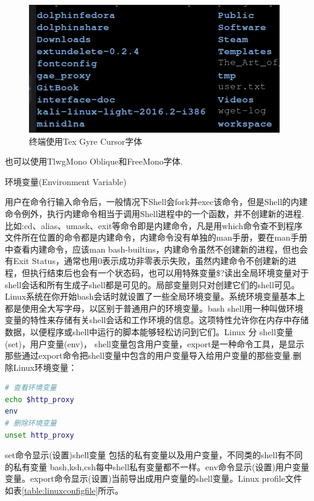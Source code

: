 \documentclass[12pt]{book}
\makeatletter
\numberwithin{dummy}{section}
\theoremstyle{ocrenumbox}
\theoremstyle{blacknumex}
\theoremstyle{blacknumbox}
\theoremstyle{ocrenum}
\renewcommand{\subsection}{\@startsection {subsection}{2}{\z@}
	{-3ex \@plus -0.1ex \@minus -.4ex}
	{0.5ex \@plus.2ex }
	{\normalfont\sffamily\bfseries}}
\makeatother
\begin{document}
\begin{figure}[htbp]
	\centering
	\includegraphics[scale=0.5]{fonttexgyrecursor.png}
	\caption{终端使用Tex Gyre Cursor字体}
	\label{fig:fonttexgyrecursor}
\end{figure}

也可以使用TlwgMono Oblique和FreeMono字体.

\subsection{环境变量(Environment Variable)}

用户在命令行输入命令后，一般情况下Shell会fork并exec该命令，但是Shell的内建命令例外，执行内建命令相当于调用Shell进程中的一个函数，并不创建新的进程.
比如:cd、alias、umask、exit等命令即是内建命令，凡是用which命令查不到程序文件所在位置的命令都是内建命令，内建命令没有单独的man手册，要在man手册中查看内建命令，应该man bash-builtins，内建命令虽然不创建新的进程，但也会有Exit Status，通常也用0表示成功非零表示失败，虽然内建命令不创建新的进程，但执行结束后也会有一个状态码，也可以用特殊变量\$?读出全局环境变量对于shell会话和所有生成子shell都是可见的。局部变量则只对创建它们的shell可见。Linux系统在你开始bash会话时就设置了一些全局环境变量。系统环境变量基本上都是使用全大写字母，以区别于普通用户的环境变量。bash shell用一种叫做环境变量的特性来存储有关shell会话和工作环境的信息。这项特性允许你在内存中存储数据，以便程序或shell中运行的脚本能够轻松访问到它们。Linux 分 shell变量(set)，用户变量(env)， shell变量包含用户变量，export是一种命令工具，是显示那些通过export命令把shell变量中包含的用户变量导入给用户变量的那些变量.删除Linux环境变量：

\begin{lstlisting}[language=Bash]
# 查看环境变量
echo $http_proxy
env
# 删除环境变量
unset http_proxy
\end{lstlisting}

set命令显示(设置)shell变量 包括的私有变量以及用户变量，不同类的shell有不同的私有变量 bash,ksh,csh每中shell私有变量都不一样。env命令显示(设置)用户变量变量。export命令显示(设置)当前导出成用户变量的shell变量。Linux profile文件如表\ref{table:linuxconfigfile}所示。
\end{document}
